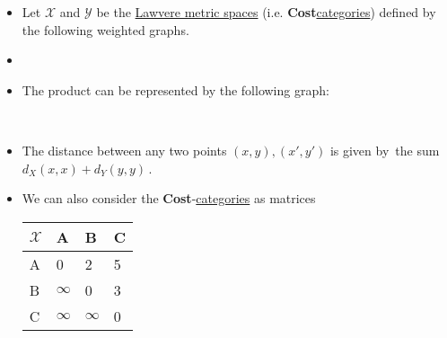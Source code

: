 \begin{itemize}
    \item Let $\mathcal{X}$ and $\mathcal{Y}$ be the \href{doc/1 math/Seven Sketches in Compositionality/Chapter 2: Resource theories/3 Enrichment/3 Lawvere metric spaces/2 Lawvere metric space}{Lawvere metric spaces} (i.e. \textbf{Cost}\href{doc/1 math/Seven Sketches in Compositionality/Chapter 2: Resource theories/3 Enrichment/1 V-categories/1 V-category}{categories}) defined by the following weighted graphs.
    \item {}
    \item The product can be represented by the following graph: \,\,
    \item The distance between any two points $(x,y),(x',y')$ is given by \,the sum $d_X(x,x)+d_Y(y,y)$\,.

    \item We can also consider the \textbf{Cost}-\href{doc/1 math/Seven Sketches in Compositionality/Chapter 2: Resource theories/3 Enrichment/1 V-categories/1 V-category}{categories} as matrices

          \begin{minipage}{0.48\textwidth}
            \begin{tabular}{|l|l|l|l|}
              \hline
              $\mathcal{X}$ & A        & B        & C \\ \hline
              A             & 0        & 2        & 5 \\ \hline
              B             & $\infty$ & 0        & 3 \\ \hline
              C             & $\infty$ & $\infty$ & 0 \\ \hline
            \end{tabular}
          \end{minipage}


\end{itemize}
